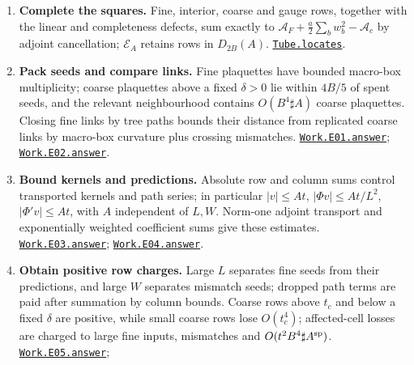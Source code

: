 \documentclass[
  letterpaper,
  11pt]{article}
\begin{document}
\begin{enumerate}
\def\labelenumi{\arabic{enumi}.}
\item
  \textbf{Complete the squares.} Fine, interior, coarse and gauge rows,
  together with the linear and completeness defects, sum exactly to
  \(\mathcal A_F+\frac a2\sum_b w_b^2-\mathcal A_c\) by adjoint
  cancellation; \(\mathcal E_A\) retains rows in \(D_{2B}(A)\).
  \href{https://github.com/yang-mills-group/OpenAI-YM-20261028/blob/3456e5e75cf8d4cd558955a5c7638fba2d68f464/YM/Pressure/Rows.lean\#L145-L163}{\texttt{Tube.locates}}.
\item
  \textbf{Pack seeds and compare links.} Fine plaquettes have bounded
  macro-box multiplicity; coarse plaquettes above a fixed \(\delta>0\)
  lie within \(4B/5\) of spent seeds, and the relevant neighbourhood
  contains \(O(B^4\sharp A)\) coarse plaquettes. Closing fine links by
  tree paths bounds their distance from replicated coarse links by
  macro-box curvature plus crossing mismatches.
  \href{https://github.com/yang-mills-group/OpenAI-YM-20261028/blob/3456e5e75cf8d4cd558955a5c7638fba2d68f464/YM/Work/E01.lean\#L289-L324}{\texttt{Work.E01.answer}};
  \href{https://github.com/yang-mills-group/OpenAI-YM-20261028/blob/3456e5e75cf8d4cd558955a5c7638fba2d68f464/YM/Work/E02.lean\#L132-L244}{\texttt{Work.E02.answer}}.
\item
  \textbf{Bound kernels and predictions.} Absolute row and column sums
  control transported kernels and path series; in particular
  \(|v|\le At\), \(|\Phi v|\le At/L^2\), \(|\Phi'v|\le At\), with \(A\)
  independent of \(L,W\). Norm-one adjoint transport and exponentially
  weighted coefficient sums give these estimates.
  \href{https://github.com/yang-mills-group/OpenAI-YM-20261028/blob/3456e5e75cf8d4cd558955a5c7638fba2d68f464/YM/Work/E03.lean\#L228-L256}{\texttt{Work.E03.answer}};
  \href{https://github.com/yang-mills-group/OpenAI-YM-20261028/blob/3456e5e75cf8d4cd558955a5c7638fba2d68f464/YM/Work/E04.lean\#L282-L307}{\texttt{Work.E04.answer}}.
\item
  \textbf{Obtain positive row charges.} Large \(L\) separates fine seeds
  from their predictions, and large \(W\) separates mismatch seeds;
  dropped path terms are paid after summation by column bounds. Coarse
  rows above \(t_c\) and below a fixed \(\delta\) are positive, while
  small coarse rows lose \(O(t_c^4)\); affected-cell losses are charged
  to large fine inputs, mismatches and \(O(t^2B^4\sharp A^{\rm sp})\).
  \href{https://github.com/yang-mills-group/OpenAI-YM-20261028/blob/3456e5e75cf8d4cd558955a5c7638fba2d68f464/YM/Work/E05.lean\#L211-L228}{\texttt{Work.E05.answer}};

\end{enumerate}
\end{document}
